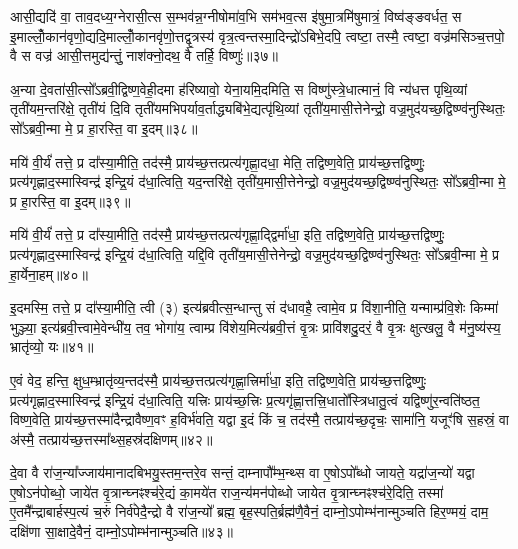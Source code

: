 आसी॒द्यदि॑ वा॒ ताव॒दध्य॒ग्नेरासी॒त्स स॒म्भव॑न्न॒ग्नीषोमा॑व॒भि सम॑भव॒त्स इ॑षुमा॒त्रमि॑षुमात्रं॒ विष्व॑ङ्ङवर्धत॒ स इ॒माल्लोँ॒कान॑वृणो॒द्यदि॒माल्लोँ॒कानवृ॑णो॒त्तद्वृ॒त्रस्य॑ वृत्र॒त्वन्तस्मा॒दिन्द्रो॑\-ऽबिभे॒दपि॒ त्वष्टा॒ तस्मै॒ त्वष्टा॒ वज्र॑मसिञ्च॒त्तपो॒ वै स वज्र॑ आसी॒त्तमुद्य॑न्तुं॒ नाश॑क्नो॒दथ॒ वै तर्\mbox{}हि॒ विष्णुः॑॥३७॥

अ॒न्या दे॒वता॑सी॒त्सो᳚\-ऽब्रवी॒द्विष्ण॒वेही॒दमा ह॑रिष्यावो॒ येना॒यमि॒दमिति॒ स विष्णु॑स्त्रे॒धात्मानं॒ वि न्य॑धत्त पृथि॒व्यां तृती॑यम॒न्तरि॑क्षे॒ तृती॑यं दि॒वि तृती॑यमभिपर्याव॒र्ताद्ध्यबि॑भे॒द्यत्पृ॑थि॒व्यां तृती॑य॒मासी॒त्तेनेन्द्रो॒ वज्र॒मुद॑यच्छ॒द्विष्ण्व॑नुस्थितः॒ सो᳚\-ऽब्रवी॒न्मा मे॒ प्र हा॒रस्ति॒ वा इ॒दम्॥३८॥

मयि॑ वी॒र्यं॑ तत्ते॒ प्र दा᳚स्या॒मीति॒ तद॑स्मै॒ प्राय॑च्छ॒त्तत्प्रत्य॑गृह्णा॒दधा॒ मेति॒ तद्विष्ण॒वेति॒ प्राय॑च्छ॒त्तद्विष्णुः॒ प्रत्य॑गृह्णाद॒स्मास्विन्द्र॑ इन्द्रि॒यं द॑धा॒त्विति॒ यद॒न्तरि॑क्षे॒ तृती॑य॒मासी॒त्तेनेन्द्रो॒ वज्र॒मुद॑यच्छ॒द्विष्ण्व॑नुस्थितः॒ सो᳚\-ऽब्रवी॒न्मा मे॒ प्र हा॒रस्ति॒ वा इ॒दम्॥३९॥

मयि॑ वी॒र्यं॑ तत्ते॒ प्र दा᳚स्या॒मीति॒ तद॑स्मै॒ प्राय॑च्छ॒त्तत्प्रत्य॑गृह्णा॒द्द्विर्मा॑धा॒ इति॒ तद्विष्ण॒वेति॒ प्राय॑च्छ॒त्तद्विष्णुः॒ प्रत्य॑गृह्णाद॒स्मास्विन्द्र॑ इन्द्रि॒यं द॑धा॒त्विति॒ यद्दि॒वि तृती॑य॒मासी॒त्तेनेन्द्रो॒ वज्र॒मुद॑यच्छ॒द्विष्ण्व॑नुस्थितः॒ सो᳚\-ऽब्रवी॒न्मा मे॒ प्र हा॒र्येना॒हम्॥४०॥

इ॒दमस्मि॒ तत्ते॒ प्र दा᳚स्या॒मीति॒ त्वी (३) इत्य॑ब्रवीत्स॒न्धान्तु सं द॑धावहै॒ त्वामे॒व प्र वि॑शा॒नीति॒ यन्माम्प्र॑वि॒शेः किम्मा॑ भुञ्ज्या॒ इत्य॑ब्रवी॒त्त्वामे॒वेन्धी॑य॒ तव॒ भोगा॑य॒ त्वाम्प्र वि॑शेय॒मित्य॑ब्रवी॒त्तं वृ॒त्रः प्रावि॑शदु॒दरं॒ वै वृ॒त्रः क्षुत्खलु॒ वै म॑नु॒ष्य॑स्य॒ भ्रातृ॑व्यो॒ यः॥४१॥

ए॒वं वेद॒ हन्ति॒ क्षुध॒म्भ्रातृ॑व्य॒न्तद॑स्मै॒ प्राय॑च्छ॒त्तत्प्रत्य॑गृह्णा॒त्त्रिर्मा॑धा॒ इति॒ तद्विष्ण॒वेति॒ प्राय॑च्छ॒त्तद्विष्णुः॒ प्रत्य॑गृह्णाद॒स्मास्विन्द्र॑ इन्द्रि॒यं द॑धा॒त्विति॒ यत्त्रिः प्राय॑च्छ॒त्त्रिः प्र॒त्यगृ॑ह्णा॒त्तत्त्रि॒धातो᳚स्त्रिधातु॒त्वं यद्विष्णु॑र॒न्वति॑ष्ठत॒ विष्ण॒वेति॒ प्राय॑च्छ॒त्तस्मा॑दैन्द्रावैष्ण॒वꣳ ह॒विर्भ॑वति॒ यद्वा इ॒दं किं च॒ तद॑स्मै॒ तत्प्राय॑च्छ॒दृचः॒ सामा॑नि॒ यजूꣳ॑षि स॒हस्रं॒ वा अ॑स्मै॒ तत्प्राय॑च्छ॒त्तस्मा᳚थ्स॒हस्र॑दक्षिणम्॥४२॥

{\anuvakamend[{प्र॒व॒णं विष्णु॒र्वा इ॒दमि॒दम॒हं यो भ॑व॒त्येक॑विꣳशतिश्च॥12॥}]}

दे॒वा वै रा॑ज॒न्या᳚ज्जाय॑मानादबिभयु॒स्तम॒न्तरे॒व सन्तं॒ दाम्नापौ᳚म्भ॒न्थ्स वा ए॒षो\-ऽपो᳚ब्धो जायते॒ यद्रा॑ज॒न्यो॑ यद्वा ए॒षो\-ऽन॑पोब्धो॒ जाये॑त वृ॒त्रान्घ्नꣴश्च॑रे॒द्यं का॒मये॑त राज॒न्य॑मन॑पोब्धो जायेत वृ॒त्रान्घ्नꣴश्च॑रे॒दिति॒ तस्मा॑ ए॒तमै᳚न्द्राबार्\mbox{}हस्प॒त्यं च॒रुं निर्व॑पेदै॒न्द्रो वै रा॑ज॒न्यो᳚ ब्रह्म॒ बृह॒स्पति॒र्ब्रह्म॑णै॒वैनं॒ दाम्नो॒\-ऽपोम्भ॑नान्मुञ्चति हिर॒ण्मयं॒ दाम॒ दक्षि॑णा सा॒क्षादे॒वैनं॒ दाम्नो॒\-ऽपोम्भ॑नान्मुञ्चति॥४३॥

